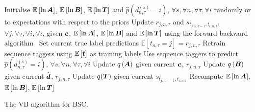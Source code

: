 \begin{algorithm}
\DontPrintSemicolon
 \nl Initialise $\mathbb{E}\left[\ln \boldsymbol A \right]$,
 $\mathbb{E}\left[\ln \boldsymbol B \right]$, $\mathbb{E}\left[\ln \boldsymbol T \right]$ 
 and $\hat{p}(d^{(s)}_{n,\tau}=i)$, $\forall s,\forall n,\forall \tau,\forall i$
  randomly or to expectations with respect to the priors\;
 {
 \nl Update $r_{j,n,\tau}$ and $s_{t_{j,n,\tau\!-\!1}, t_{\iota,n,\tau}}$, $\forall j,\forall \tau,\forall i,\forall \iota$,
 given $\boldsymbol c$, 
 $\mathbb{E}\left[\ln \boldsymbol A \right]$, $\mathbb{E}\left[\ln \boldsymbol B \right]$ and $\mathbb{E}\left[\ln \boldsymbol T \right]$
 using the forward-backward algorithm~\cite{ghahramani2001introduction}\;
 \nl Set current true label predictions $\mathbb{E}\left[t_{n,\tau}=j\right] = r_{j,n,\tau}$ \;
 \nl Retrain sequence taggers using $\mathbb{E}\left[\boldsymbol t\right]$ as training labels\;
 \nl Use sequence taggers to predict $\hat{p}(d^{(s)}_{n,\tau}=i)$, $\forall s,\forall n,\forall \tau,\forall i$\;
 \nl Update $q\left(\boldsymbol A\right)$ given current $\boldsymbol c$, $r_{j,n,\tau}$\;
 \nl Update $q\left(\boldsymbol B\right)$ given current $\hat{\boldsymbol d}$, $r_{j,n,\tau}$\;
 \nl Update $q(\boldsymbol T)$ given current $s_{t_{j,n,\tau\!-\!1}, t_{\iota,n,\tau}}$\;
 \nl Recompute $\mathbb{E}\left[\ln \boldsymbol A \right]$, $\mathbb{E}\left[\ln \boldsymbol B \right]$, $\mathbb{E}\left[\ln\boldsymbol T \right]$ 
 }
\;
\caption{The VB algorithm for BSC.}
\label{al:vb_bac}
\end{algorithm}

